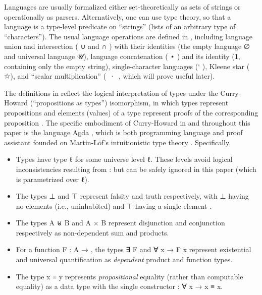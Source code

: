 \documentclass[acmsmall,screen,anonymous,timestamp]{acmart}
\begin{document}
Languages are usually formalized either set-theoretically as sets of strings or operationally as parsers.
Alternatively, one can use type theory, so that a language is a type-level predicate on ``strings'' (lists of an arbitrary type  of ``characters'').
The usual language operations are defined in , including language union and intersection ({ \AF ∪ } and { \AF ∩ }) with their identities (the empty language \AF ∅ and universal language \AF 𝒰), language concatenation ({ \AF ⋆ }) and its identity (\AF 𝟏, containing only the empty string), single-character languages ({\AF ` }), Kleene star ({ \AF ☆}), and ``scalar multiplication'' (\mbox{ \AF · }, which will prove useful later).

The definitions in  reflect the logical interpretation of types under the Curry-Howard (``propositions as types'') isomorphism, in which types represent propositions and elements (values) of a type represent proofs of the corresponding proposition \citep{Wadler2015propositions}.
The specific embodiment of Curry-Howard in  and throughout this paper is the language Agda \citep{Norell2008AFP, BoveEtAl2009Agda}, which is both programming language and proof assistant founded on Martin-Löf's intuitionistic type theory \citep{MartinLöf1984intuitionistic}.
Specifically,
\begin{itemize}

\item Types have type { \AB ℓ} for some universe level \AB ℓ.
These levels avoid logical inconsistencies resulting from { \AS : } but can be safely ignored in this paper (which is parametrized over \AB ℓ).

\item The types \AD ⊥ and \ARe ⊤ represent falsity and truth respectively, with \AD ⊥ having no elements (i.e., uninhabited) and \ARe ⊤ having a single element .

\item The types {\AB A \AD ⊎ \AB B} and {\AB A \ARe × \AB B} represent disjunction and conjunction respectively as non-dependent sum and products.

\item For a function {\AB F \AS : \AB A \AS →  }, the types {\AF ∃ \AB F}  and {\AF ∀ \AB x \AS → \AB F \AB x} represent existential and universal quantification as \emph{dependent} product and function types.

\item The type {\AB x \AD ≡ \AB y} represents \emph{propositional} equality (rather than computable equality) as a data type with the single constructor { \AS : \AS ∀ \AB x \AS → \AB x \AD ≡ \AB x}.

\end{itemize}
\end{document}

